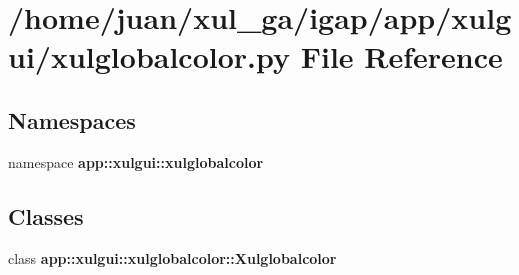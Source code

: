 \section{/home/juan/xul\_\-ga/igap/app/xulgui/xulglobalcolor.py File Reference}
\label{xulglobalcolor_8py}
\subsection*{Namespaces}
\begin{CompactItemize}
\item 
namespace {\bf app::xulgui::xulglobalcolor}
\end{CompactItemize}
\subsection*{Classes}
\begin{CompactItemize}
\item 
class {\bf app::xulgui::xulglobalcolor::Xulglobalcolor}
\end{CompactItemize}
